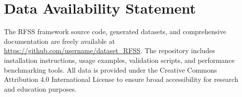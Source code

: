 \documentclass[twocolumn,10pt]{article}
\begin{document}
\section*{Data Availability Statement}

The RFSS framework source code, generated datasets, and comprehensive documentation are freely available at \url{https://github.com/username/dataset_RFSS}. The repository includes installation instructions, usage examples, validation scripts, and performance benchmarking tools. All data is provided under the Creative Commons Attribution 4.0 International License to ensure broad accessibility for research and education purposes.



\end{document}
